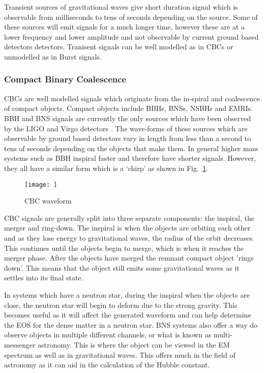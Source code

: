 Transient sources of gravitational waves give short duration signal which is observable from milliseconds to tens of seconds depending on the source. 
Some of these sources will emit signals for a much longer time, however these are at a lower frequency and lower amplitude and not observable by current ground based detectors detectors.
Tranisent signals can be well modelled as in \acp{CBC} or unmodelled as in Burst signals.

\subsubsection{\label{sources:transient:cbc} Compact Binary Coalescence}

\acp{CBC} are well modelled signals which originate from the in-spiral and coalescence of compact objects. 
Compact objects include \acp{BBH}, \acp{BNS}, \acp{NSBH} and \acp{EMRI}.
\ac{BBH} and \ac{BNS} signals are currently the only sources which have been observed by the \ac{LIGO} and Virgo detectors \cite{}. 
The wave-forms of these sources which are observable by ground based detectors vary in length from less than a second to tens of seconds depending on the objects that make them.
In general higher mass systems such as \ac{BBH} inspiral faster and therefore have shorter signals.
However, they all have a similar form which is a `chirp' as shown in Fig.~\ref{sources:transient:cbc:wave}.

\begin{figure}[h]
    \centering
    \texttt{[image: ]}
    \caption{CBC waveform}
    \label{sources:transient:cbc:wave}
\end{figure}


\ac{CBC} signals are generally split into three separate components: the inspiral, the merger and ring-down. 
The inspiral is when the objects are orbiting each other and as they lose energy to gravitational waves, the radius of the orbit decreases.
This continues until the objects begin to merge, which is when it reaches the merger phase.
After the objects have merged the remnant compact object 'rings down'. This means that the object still emits some gravitational waves as it settles into its final state.

In systems which have a neutron star, during the inspiral when the objects are close, the neutron star will begin to deform due to the strong gravity. 
This becomes useful as it will affect the generated waveform and can help determine the \ac{EOS} for the dense matter in a neutron star.
\ac{BNS} systems also offer a way do observe objects in multiple different channels, or what is known as multi-messenger astronomy. 
This is where the object can be viewed in the \ac{EM} spectrum as well as in gravitational waves.
This offers much in the field of astronomy as it can aid in the calculation of the Hubble constant. 


